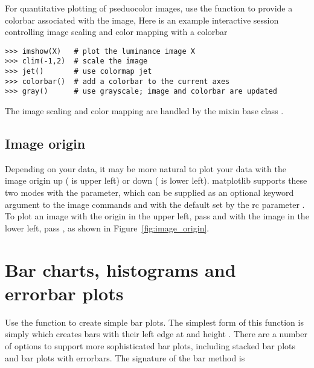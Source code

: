 \documentclass[twoside]{book}
\begin{document}
For quantitative plotting of pseduocolor images, use the
 function to provide a colorbar associated with the
image, Here is an example interactive session controlling image
scaling and color mapping with a colorbar

\begin{lstlisting}
>>> imshow(X)   # plot the luminance image X
>>> clim(-1,2)  # scale the image
>>> jet()       # use colormap jet
>>> colorbar()  # add a colorbar to the current axes
>>> gray()      # use grayscale; image and colorbar are updated
\end{lstlisting}

The image scaling and color mapping are handled by the mixin base
class .

\subsection{Image origin}
\label{sec:image_origin}

Depending on your data, it may be more natural to plot your data with
the image origin up ( is upper left) or down
( is lower left).  matplotlib supports these two modes
with the  parameter, which can be supplied as an optional
keyword argument to the image commands  and
 with the default set by the rc parameter
.  To plot an image with the origin in the upper
left, pass  and with the image in the lower left,
pass , as shown in Figure~\ref{fig:image_origin}.








\section{Bar charts, histograms and errorbar plots}
\label{sec:barcharts}

Use the  function to create simple bar plots.  The simplest
form of this function is simply  which creates bars
with their left edge at  and height .  There are a
number of options to support more sophisticated bar plots, including
stacked bar plots and bar plots with errorbars.  The signature of the
bar method is
\end{document}
